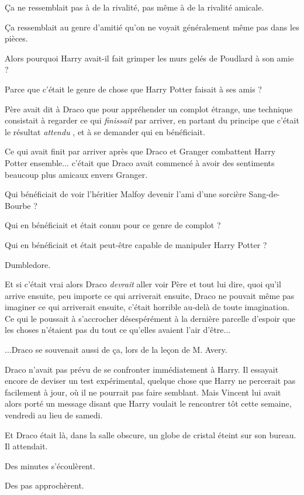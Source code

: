 Ça ne ressemblait pas à de la rivalité, pas même à de la rivalité amicale.

Ça ressemblait au genre d'amitié qu'on ne voyait généralement même pas dans les pièces.

Alors pourquoi Harry avait-il fait grimper les murs gelés de Poudlard à son amie ?

Parce que c'était le genre de chose que Harry Potter faisait à ses amis ?

Père avait dit à Draco que pour appréhender un complot étrange, une technique consistait à regarder ce qui \emph{finissait}  par arriver, en partant du principe que c'était le résultat \emph{attendu} , et à se demander qui en bénéficiait.

Ce qui avait finit par arriver après que Draco et Granger combattent Harry Potter ensemble... c'était que Draco avait commencé à avoir des sentiments beaucoup plus amicaux envers Granger.

Qui bénéficiait de voir l'héritier Malfoy devenir l'ami d'une sorcière Sang-de-Bourbe ?

Qui en bénéficiait et était connu pour ce genre de complot ?

Qui en bénéficiait et était peut-être capable de manipuler Harry Potter ?

Dumbledore.

Et si c'était vrai alors Draco \emph{devrait}  aller voir Père et tout lui dire, quoi qu'il arrive ensuite, peu importe ce qui arriverait ensuite, Draco ne pouvait même pas imaginer ce qui arriverait ensuite, c'était horrible au-delà de toute imagination. Ce qui le poussait à s'accrocher désespérément à la dernière parcelle d'espoir que les choses n'étaient pas du tout ce qu'elles avaient l'air d'être...

...Draco se souvenait aussi de ça, lors de la leçon de M. Avery.

Draco n'avait pas prévu de se confronter immédiatement à Harry. Il essayait encore de deviser un test expérimental, quelque chose que Harry ne percerait pas facilement à jour, où il ne pourrait pas faire semblant. Mais Vincent lui avait alors porté un message disant que Harry voulait le rencontrer tôt cette semaine, vendredi au lieu de samedi.

Et Draco était là, dans la salle obscure, un globe de cristal éteint sur son bureau. Il attendait.

Des minutes s'écoulèrent.

Des pas approchèrent.

